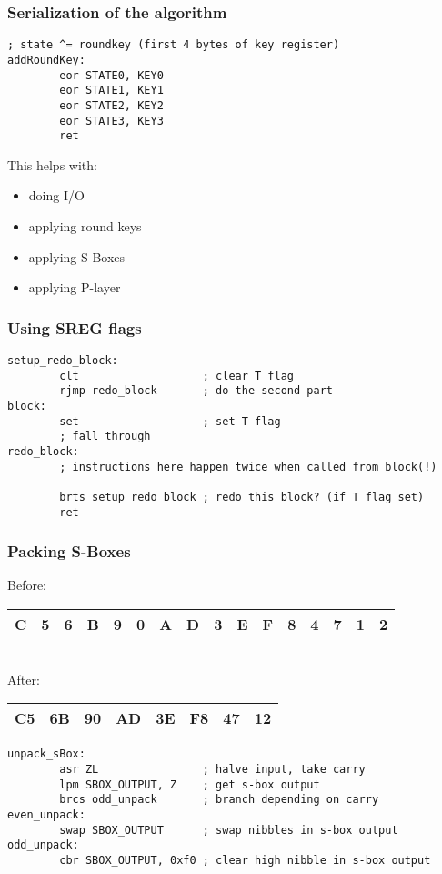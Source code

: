 \documentclass{beamer}
\begin{document}
\begin{frame}[fragile]
\frametitle{Serialization of the algorithm}
\begin{lstlisting}
; state ^= roundkey (first 4 bytes of key register)
addRoundKey:
        eor STATE0, KEY0
        eor STATE1, KEY1
        eor STATE2, KEY2
        eor STATE3, KEY3
        ret
\end{lstlisting}

This helps with:
\begin{itemize}
        \item doing I/O
        \item applying round keys
        \item applying S-Boxes
        \item applying P-layer
\end{itemize}

\end{frame}

\begin{frame}[fragile]
\frametitle{Using SREG flags}
\begin{lstlisting}
setup_redo_block:
        clt                   ; clear T flag
        rjmp redo_block       ; do the second part
block:
        set                   ; set T flag
        ; fall through
redo_block:
        ; instructions here happen twice when called from block(!)

        brts setup_redo_block ; redo this block? (if T flag set)
        ret
\end{lstlisting}
\end{frame}

\begin{frame}[fragile]
\frametitle{Packing S-Boxes}
	\footnotesize{
	Before: \\
	\begin{tabular}{ | c | c | c | c | c | c | c | c | c | c | c | c | c | c | c | c | }
	  \hline                        
	  C & 5 & 6 & B & 9 & 0 & A & D & 3 & E & F & 8 & 4 & 7 & 1 & 2 \\
	  \hline  
	\end{tabular}
	\\

	After: \\
	\begin{tabular}{ | c | c | c | c | c | c | c | c | }
	  \hline                        
	  C5 & 6B & 90 & AD & 3E & F8 & 47 & 12 \\
	  \hline  
	\end{tabular}
	}

\begin{lstlisting}
unpack_sBox:
        asr ZL                ; halve input, take carry
        lpm SBOX_OUTPUT, Z    ; get s-box output
        brcs odd_unpack       ; branch depending on carry
even_unpack:
        swap SBOX_OUTPUT      ; swap nibbles in s-box output
odd_unpack:
        cbr SBOX_OUTPUT, 0xf0 ; clear high nibble in s-box output
\end{lstlisting}
\end{frame}
\end{document}

